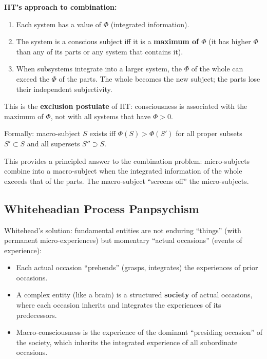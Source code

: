 \documentclass[11pt,a4paper]{report}
\begin{document}
\begin{mathbox}
\vspace{-6pt}
\textbf{IIT's approach to combination:}
\begin{enumerate}[leftmargin=1.5em]
  \item Each system has a value of $\Phi$ (integrated information).
  \item The system is a conscious subject iff it is a \textbf{maximum of $\Phi$} (it has higher $\Phi$ than any of its parts or any system that contains it).
  \item When subsystems integrate into a larger system, the $\Phi$ of the whole can exceed the $\Phi$ of the parts. The whole becomes the new subject; the parts lose their independent subjectivity.
\end{enumerate}
This is the \textbf{exclusion postulate} of IIT: consciousness is associated with the maximum of $\Phi$, not with all systems that have $\Phi > 0$.

Formally: macro-subject $S$ exists iff $\Phi(S) > \Phi(S')$ for all proper subsets $S' \subset S$ and all supersets $S'' \supset S$.
\vspace{-4pt}
\end{mathbox}

This provides a principled answer to the combination problem: micro-subjects combine into a macro-subject when the integrated information of the whole exceeds that of the parts. The macro-subject ``screens off'' the micro-subjects.

\subsection{Whiteheadian Process Panpsychism}

Whitehead's solution: fundamental entities are not enduring ``things'' (with permanent micro-experiences) but momentary ``actual occasions'' (events of experience):
\begin{itemize}[leftmargin=1.5em]
  \item Each actual occasion ``prehends'' (grasps, integrates) the experiences of prior occasions.
  \item A complex entity (like a brain) is a structured \textbf{society} of actual occasions, where each occasion inherits and integrates the experiences of its predecessors.
  \item Macro-consciousness is the experience of the dominant ``presiding occasion'' of the society, which inherits the integrated experience of all subordinate occasions.
\end{itemize}
\end{document}
